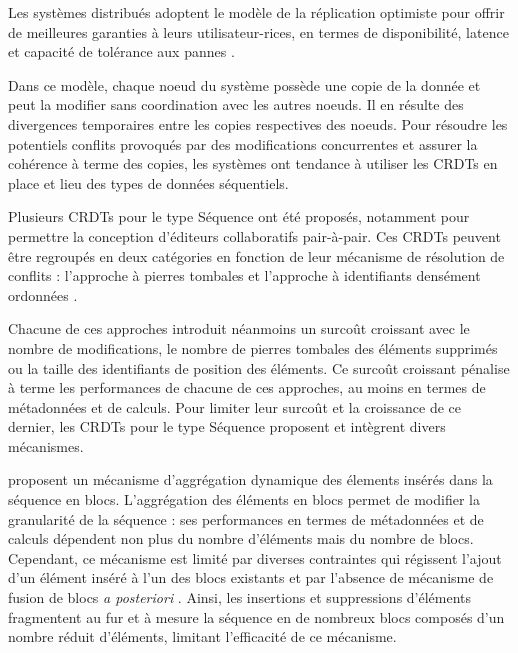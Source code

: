 Les systèmes distribués adoptent le modèle de la réplication optimiste \cite{2005-optimistic-replication-saito} pour offrir de meilleures garanties à leurs utilisateur-rices, en termes de disponibilité, latence et capacité de tolérance aux pannes \cite{pacelc2012}.

Dans ce modèle, chaque noeud du système possède une copie de la donnée et peut la modifier sans coordination avec les autres noeuds.
Il en résulte des divergences temporaires entre les copies respectives des noeuds.
Pour résoudre les potentiels conflits provoqués par des modifications concurrentes et assurer la cohérence à terme des copies, les systèmes ont tendance à utiliser les \acp{CRDT} \cite{shapiro_2011_crdt} en place et lieu des types de données séquentiels.

Plusieurs \acp{CRDT} pour le type Séquence ont été proposés, notamment pour permettre la conception d'éditeurs collaboratifs pair-à-pair.
Ces \acp{CRDT} peuvent être regroupés en deux catégories en fonction de leur mécanisme de résolution de conflits : l'approche à pierres tombales \cite{2006-woot-oster,2007-wooto-weiss,2011-evaluation-crdts-ahmed-nacer,ROH2011354,briot:hal-01343941,2019-interleaving-anomalies-collaborative-editors-kleppmann} et l'approche à identifiants densément ordonnées \cite{2009-treedoc-preguica,2009-logoot-weiss,2010-logoot-undo-weiss,letia:hal-01248270,zawirski:hal-01248197,2013-logootsplit,lseq2013,lseq2017,2021-these-vic}.

Chacune de ces approches introduit néanmoins un surcoût croissant avec le nombre de modifications, \ie le nombre de pierres tombales des éléments supprimés ou la taille des identifiants de position des éléments.
Ce surcoût croissant pénalise à terme les performances de chacune de ces approches, au moins en termes de métadonnées et de calculs.
Pour limiter leur surcoût et la croissance de ce dernier, les \acp{CRDT} pour le type Séquence proposent et intègrent divers mécanismes.

\cite{2013-logootsplit,briot:hal-01343941} proposent un mécanisme d'aggrégation dynamique des élements insérés dans la séquence en blocs.
L'aggrégation des éléments en blocs permet de modifier la granularité de la séquence : ses performances en termes de métadonnées et de calculs dépendent non plus du nombre d'éléments mais du nombre de blocs.
Cependant, ce mécanisme est limité par diverses contraintes qui régissent l'ajout d'un élément inséré à l'un des blocs existants et par l'absence de mécanisme de fusion de blocs \emph{a posteriori} .
Ainsi, les insertions et suppressions d'éléments fragmentent au fur et à mesure la séquence en de nombreux blocs composés d'un nombre réduit d'éléments, limitant l'efficacité de ce mécanisme.


